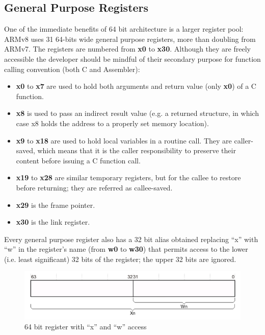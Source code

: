 \documentclass[12pt,a4paper,openright,twoside]{report}
\begin{document}
\subsection{General Purpose Registers}
One of the immediate benefits of 64 bit architecture is a larger register pool:
ARMv8 uses 31 64-bits wide general purpose registers, more than doubling from
ARMv7.
The registers are numbered from \textbf{x0} to \textbf{x30}. Although they are
freely accessible the developer should be mindful of their secondary purpose
for function calling convention (both C and Assembler):
\begin{itemize}
    \item \textbf{x0} to \textbf{x7} are used to hold both arguments and return
        value (only \textbf{x0}) of a C function.
    \item \textbf{x8} is used to pass an indirect result value (e.g. a returned 
        structure, in which case x8 holds the address to a properly set memory
        location).
    \item \textbf{x9} to \textbf{x18} are used to hold local variables in a 
        routine call. They are caller-saved, which means that it is the caller
        responsibility to preserve their content before issuing a C function call.
    \item \textbf{x19} to \textbf{x28} are similar temporary registers, but for 
        the callee to restore before returning; they are referred as callee-saved.
    \item \textbf{x29} is the frame pointer.
    \item \textbf{x30} is the link register.
\end{itemize}
Every general purpose register also has a 32 bit alias obtained replacing ``x''
with ``w'' in the register's name (from \textbf{w0} to \textbf{w30}) that permits
access to the lower (i.e. least significant) 32 bits of the register; the upper 
32 bits are ignored.

\begin{figure}[h]
    \begin{center}
\includegraphics[scale=0.55]{tesi8.png}
\caption[32 bit alias]{64 bit register with ``x'' and ``w'' access}\label{fig:32reg}
    \end{center}
\end{figure}
\end{document}
